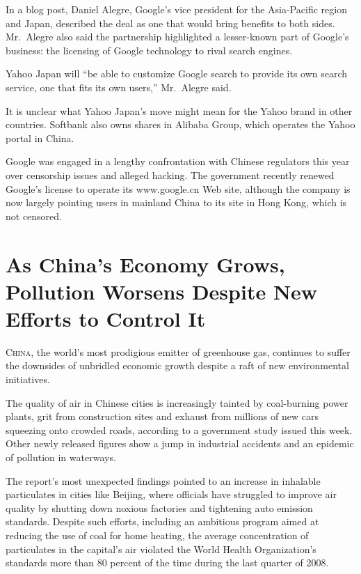 ﻿\documentclass[12pt]{article}
\begin{document}
In a blog post, Daniel Alegre, Google's vice president for the Asia-Pacific region and Japan,
described the deal as one that would bring benefits to both sides. Mr.~Alegre also said the
partnership highlighted a lesser-known part of Google's business: the licensing of Google technology
to rival search engines.

Yahoo Japan will ``be able to customize Google search to provide its own search service, one that
fits its own users,'' Mr.~Alegre said.

It is unclear what Yahoo Japan's move might mean for the Yahoo brand in other countries. Softbank
also owns shares in Alibaba Group, which operates the Yahoo portal in China.

Google was engaged in a lengthy confrontation with Chinese regulators this year over censorship
issues and alleged hacking. The government recently renewed Google's license to operate its
www.google.cn Web site, although the company is now largely pointing users in mainland China to its
site in Hong Kong, which is not censored.

\section{As China's Economy Grows, Pollution Worsens Despite New Efforts to Control It}

\lettrine{C}{hina}, the world's most prodigious emitter of greenhouse gas,
continues to suffer the downsides of unbridled economic growth despite a raft of new environmental
initiatives.

The quality of air in Chinese cities is increasingly tainted by coal-burning power plants, grit from
construction sites and exhaust from millions of new cars squeezing onto crowded roads, according to
a government study issued this week. Other newly released figures show a jump in industrial
accidents and an epidemic of pollution in waterways.

The report's most unexpected findings pointed to an increase in inhalable particulates in cities
like Beijing, where officials have struggled to improve air quality by shutting down noxious
factories and tightening auto emission standards. Despite such efforts, including an ambitious
program aimed at reducing the use of coal for home heating, the average concentration of
particulates in the capital's air violated the World Health Organization's standards more than 80
percent of the time during the last quarter of 2008.
\end{document}
